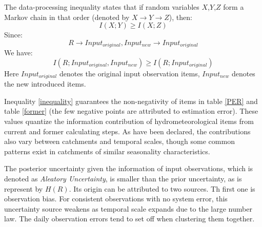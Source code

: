 \documentclass[draft,wrr]{AGUTeX}
\begin{document}
\begin{article}
The data-processing inequality states that if random variables $X$,$Y$,$Z$ form a Markov chain in that order (denoted by $X \rightarrow Y \rightarrow Z$), then:
\begin{equation}
I(X;Y) \geq I(X;Z)
\end{equation}
Since:
\begin{equation}
R \rightarrow Input_{original},Input_{new} \rightarrow Input_{original}
\end{equation} 
We have:
\begin{equation}
\label{inequality}
I(R;Input_{original},Input_{new}) \geq I(R;Input_{original})
\end{equation}
Here $Input_{original}$ denotes the original input observation items, $Input_{new}$ denotes the new introduced items.  

Inequality \ref{inequality} guarantees the non-negativity of items in table \ref{PER} and table \ref{former} (the few negative points are attributed to estimation error).  
These values quantize the information contribution of  hydrometeorological items from current and former calculating steps. As have been declared, the contributions also vary between catchments and temporal scales, though some common patterns exist in catchments of similar seasonality characteristics.




The posterior uncertainty given the information of input observations, which is denoted as \emph{Aleatory Uncertainty}, is smaller than the prior uncertainty, as is represent by $H(R)$. Its origin can be attributed to two sources. Th first one is  observation bias. For consistent observations with no system error, this uncertainty source  weakens as temporal scale expands  due to the large number law. The daily observation errors tend to set off when clustering them together. 


\end{article}
\end{document}

